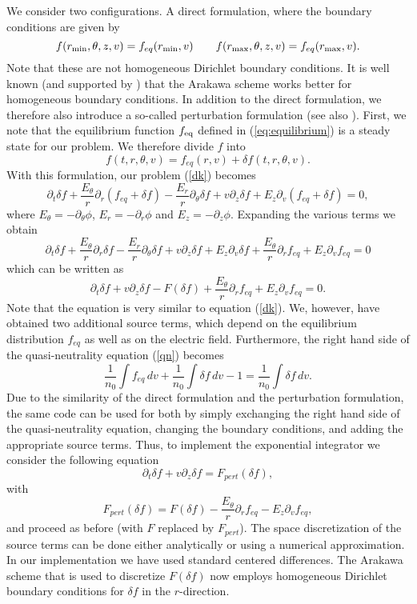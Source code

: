 We consider two configurations. A direct formulation, where the boundary conditions are given by
$$
f(r_{\rm min},\theta ,z,v)=f_{eq}(r_{\rm min},v) \qquad
f(r_{\rm max},\theta ,z,v)=f_{eq}(r_{\rm max},v).
$$
Note that these are not homogeneous Dirichlet boundary conditions. It is well known (and supported by \cite{cep}) 
that the Arakawa scheme works better for homogeneous boundary conditions. In addition to the direct formulation, we therefore also introduce a so-called perturbation formulation (see also \cite{vlasovia, latu2}).
First, we note that the equilibrium function $f_{\rm eq}$ defined in (\ref{eq:equilibrium}) is a steady state for our problem. We therefore divide $f$ into
$$
f(t,r,\theta ,v)=f_{eq}(r,v)+\delta f(t,r,\theta ,v).
$$
With this formulation, our problem (\ref{dk}) becomes
$$
\partial_t\delta f+\frac{E_\theta}{r}\partial_r (f_{eq} + \delta f)-\frac{E_r}{r}\partial_\theta \delta f+v\partial_z\delta f+E_z \partial_v (f_{eq} + \delta f)=0,
$$
where $E_\theta=-\partial_\theta \phi$, $E_r=-\partial_r \phi$ and $E_z=-\partial_z \phi$. Expanding the various terms we obtain
$$
\partial_t\delta f+\frac{E_\theta}{r}\partial_r\delta f-\frac{E_r}{r}\partial_\theta \delta f+v\partial_z\delta f+ E_z \partial_v \delta f
+\frac{E_\theta}{r}\partial_r f_{eq} + E_z \partial _v f_{eq}=0
$$
which can be written as
$$
\partial_t\delta f + v\partial_z \delta f -F(\delta f) +\frac{E_\theta}{r}\partial_r f_{eq} +E_z\partial _v f_{eq} = 0.
$$
Note that the equation is very similar to equation (\ref{dk}). We, however, have obtained two additional source terms, which depend on the equilibrium distribution $f_{eq}$ as well as on the electric field.
Furthermore, the right hand side of the quasi-neutrality equation (\ref{qn}) becomes
$$
\frac{1}{n_0}\int f_{eq} \,dv+\frac{1}{n_0}\int \delta f \,dv-1 = \frac{1}{n_0}\int \delta f \,dv.
$$
Due to the similarity of the direct formulation and the perturbation formulation, the same code can 
be used for both by simply exchanging the right hand side of the quasi-neutrality equation, changing the boundary conditions, and adding the appropriate source terms. Thus, to implement the exponential integrator we consider the following equation 
$$ \partial_t\delta f + v\partial_z \delta f  = F_{pert}(\delta f),  $$
with
$$ F_{pert} (\delta f)= F(\delta f) -\frac{E_\theta}{r}\partial_r f_{eq} - E_z\partial _v f_{eq},  $$
and proceed as before (with $F$ replaced by $F_{pert}$). The space discretization of the source terms can be done either analytically or using a numerical approximation. In our implementation we have used standard centered differences. The Arakawa scheme that is used to discretize $F(\delta f)$ now employs homogeneous Dirichlet boundary conditions for $\delta f$ in the $r$-direction.


